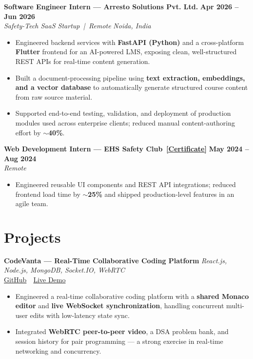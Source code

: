 \documentclass[a4paper,10.5pt]{article}
\newcommand{\resumeSubheading}[4]{%
  \noindent\textbf{\color{accent}#1} \hfill \textbf{\small#2} \\
  \noindent\textit{\small\color{gray}#3} \hfill \textit{\small\color{gray}#4} \vspace{2pt}%
}
\newcommand{\resumeItem}[1]{\item\small #1}
\begin{document}
\vspace{4pt}

\resumeSubheading
{Software Engineer Intern --- Arresto Solutions Pvt. Ltd.}{Apr 2026 -- Jun 2026}
{Safety-Tech SaaS Startup \,|\, Remote}{Noida, India}
\begin{itemize}
  \resumeItem{Engineered backend services with \textbf{FastAPI (Python)} and a cross-platform \textbf{Flutter} frontend for an AI-powered LMS, exposing clean, well-structured REST APIs for real-time content generation.}
  \resumeItem{Built a document-processing pipeline using \textbf{text extraction, embeddings, and a vector database} to automatically generate structured course content from raw source material.}
  \resumeItem{Supported end-to-end testing, validation, and deployment of production modules used across enterprise clients; reduced manual content-authoring effort by $\sim$\textbf{40\%}.}
\end{itemize}

\vspace{4pt}

\resumeSubheading
{Web Development Intern --- EHS Safety Club \,\href{https://drive.google.com/file/d/1Qdter8Ndw98bpQBjL-DrfLcrUbw5Wf1_/view?usp=sharing}{\small[Certificate]}}{May 2024 -- Aug 2024}
{Remote}{}
\begin{itemize}
  \resumeItem{Engineered reusable UI components and REST API integrations; reduced frontend load time by $\sim$\textbf{25\%} and shipped production-level features in an agile team.}
\end{itemize}

\section*{Projects}

\noindent\textbf{\color{accent}CodeVanta --- Real-Time Collaborative Coding Platform}
\hfill \emph{React.js, Node.js, MongoDB, Socket.IO, WebRTC}\\
{\small
  \href{https://github.com/Ishita-coder27/Codevanta}{GitHub}
  \,\textbar\,
  \href{https://codevanta-orcin.vercel.app/}{Live Demo}
}
\begin{itemize}
  \resumeItem{Engineered a real-time collaborative coding platform with a \textbf{shared Monaco editor} and \textbf{live WebSocket synchronization}, handling concurrent multi-user edits with low-latency state sync.}
  \resumeItem{Integrated \textbf{WebRTC peer-to-peer video}, a DSA problem bank, and session history for pair programming --- a strong exercise in real-time networking and concurrency.}
\end{itemize}
\end{document}
